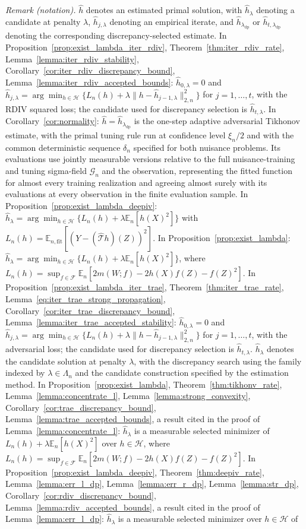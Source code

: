 \documentclass[12pt]{article}
\theoremstyle{plain}
\theoremstyle{definition}
\theoremstyle{remark}
\begin{document}
\noindent\textit{Remark (notation).} $\hat h$ denotes an estimated primal solution, with $\hat h_\lambda$ denoting a candidate at penalty $\lambda$, $\hat h_{j,\lambda}$ denoting an empirical iterate, and $\hat h_{\lambda_{\mathrm{dp}}}$ or $\hat h_{t,\lambda_{\mathrm{dp}}}$ denoting the corresponding discrepancy-selected estimate. In Proposition~\ref{prop:exist_lambda_iter_rdiv}, Theorem~\ref{thm:iter_rdiv_rate}, Lemma~\ref{lemma:iter_rdiv_stability}, Corollary~\ref{cor:iter_rdiv_discrepancy_bound}, Lemma~\ref{lemma:iter_rdiv_accepted_bounds}: $\hat h_{0,\lambda}=0$ and $\hat h_{j,\lambda}=\arg\min_{h\in\mathcal H}\{L_n(h)+\lambda\|h-\hat h_{j-1,\lambda}\|_{2,n}^2\}$ for $j=1,\ldots,t$, with the RDIV squared loss; the candidate used for discrepancy selection is $\hat h_{t,\lambda}$. In Corollary~\ref{cor:normality}: $\hat h=\hat h_{\lambda_{\mathrm{dp}}}$ is the one-step adaptive adversarial Tikhonov estimate, with the primal tuning rule run at confidence level $\xi_n/2$ and with the common deterministic sequence $\delta_n$ specified for both nuisance problems. Its evaluations use jointly measurable versions relative to the full nuisance-training and tuning sigma-field $\mathcal G_n$ and the observation, representing the fitted function for almost every training realization and agreeing almost surely with its evaluations at every observation in the finite evaluation sample. In Proposition~\ref{prop:exist_lambda_deepiv}: $\hat h_\lambda=\arg\min_{h\in\mathcal H}\{L_n(h)+\lambda\mathbb E_n[h(X)^2]\}$ with $L_n(h)=\mathbb E_{n,\mathrm{fit}}[(Y-(\hat{\mathcal T}h)(Z))^2]$. In Proposition~\ref{prop:exist_lambda}: $\hat h_\lambda=\arg\min_{h\in\mathcal H}\{L_n(h)+\lambda\mathbb E_n[h(X)^2]\}$, where $L_n(h)=\sup_{f\in\mathcal F}\mathbb E_n[2m(W;f)-2h(X)f(Z)-f(Z)^2]$. In Proposition~\ref{prop:exist_lambda_iter_trae}, Theorem~\ref{thm:iter_trae_rate}, Lemma~\ref{eq:iter_trae_strong_propagation}, Corollary~\ref{cor:iter_trae_discrepancy_bound}, Lemma~\ref{lemma:iter_trae_accepted_stability}: $\hat h_{0,\lambda}=0$ and $\hat h_{j,\lambda}=\arg\min_{h\in\mathcal H}\{L_n(h)+\lambda\|h-\hat h_{j-1,\lambda}\|_{2,n}^2\}$ for $j=1,\ldots,t$, with the adversarial loss; the candidate used for discrepancy selection is $\hat h_{t,\lambda}$. $\hat h_\lambda$ denotes the candidate solution at penalty $\lambda$, with the discrepancy search using the family indexed by $\lambda\in\Lambda_n$ and the candidate construction specified by the estimation method. In Proposition~\ref{prop:exist_lambda}, Theorem~\ref{thm:tikhonv_rate}, Lemma~\ref{lemma:concentrate_l}, Lemma~\ref{lemma:strong_convexity}, Corollary~\ref{cor:trae_discrepancy_bound}, Lemma~\ref{lemma:trae_accepted_bounds}, a result cited in the proof of Lemma~\ref{lemma:concentrate_l}: $\hat h_\lambda$ is a measurable selected minimizer of $L_n(h)+\lambda\mathbb E_n[h(X)^2]$ over $h\in\mathcal H$, where $L_n(h)=\sup_{f\in\mathcal F}\mathbb E_n[2m(W;f)-2h(X)f(Z)-f(Z)^2]$. In Proposition~\ref{prop:exist_lambda_deepiv}, Theorem~\ref{thm:deepiv_rate}, Lemma~\ref{lemma:err_l_dp}, Lemma~\ref{lemma:err_r_dp}, Lemma~\ref{lemma:str_dp}, Corollary~\ref{cor:rdiv_discrepancy_bound}, Lemma~\ref{lemma:rdiv_accepted_bounds}, a result cited in the proof of Lemma~\ref{lemma:err_l_dp}: $\hat h_\lambda$ is a measurable selected minimizer over $h\in\mathcal H$ of 
\end{document}
